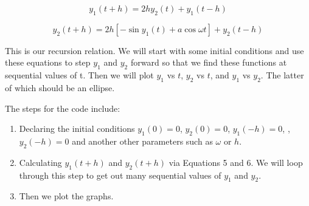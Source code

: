 \documentclass[11pt]{amsart}
\begin{document}
\begin{equation}
y_1(t+h) = 2h y_2(t) + y_1(t-h)
\end{equation}

\begin{equation}
y_2(t+h) = 2h \left[- \sin{y_1(t)}+a \cos{\omega t} \right] + y_2(t-h)
\end{equation}
\vspace{2 mm}

This is our recursion relation.  We will start with some initial conditions and use these equations to step $y_1$ and $y_2$ forward so that we find these functions at sequential values of t.  Then we will plot $y_1$ vs $t$, $y_2$ vs $t$, and $y_1$ vs $y_2$.  The latter of which should be an ellipse. 
\newline

The steps for the code include:
\begin{enumerate}
\item  Declaring the initial conditions $y_1(0)=0$, $y_2(0)=0$, $y_1(-h)=0$, ,$y_2(-h)=0$ and another other parameters such as $\omega$ or $h$.
\item Calculating $y_1(t+h)$ and $y_2(t+h)$ via Equations 5 and 6.  We will loop through this step to get out many sequential values of $y_1$ and $y_2$.
\item Then we plot the graphs.
\end{enumerate}
\end{document}
